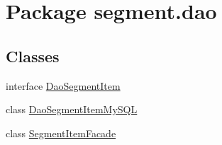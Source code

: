\hypertarget{namespacesegment_1_1dao}{}\section{Package segment.\+dao}
\label{namespacesegment_1_1dao}
\subsection*{Classes}
\begin{DoxyCompactItemize}
\item 
interface \mbox{\hyperlink{interfacesegment_1_1dao_1_1_dao_segment_item}{Dao\+Segment\+Item}}
\item 
class \mbox{\hyperlink{classsegment_1_1dao_1_1_dao_segment_item_my_s_q_l}{Dao\+Segment\+Item\+My\+S\+QL}}
\item 
class \mbox{\hyperlink{classsegment_1_1dao_1_1_segment_item_facade}{Segment\+Item\+Facade}}
\end{DoxyCompactItemize}
